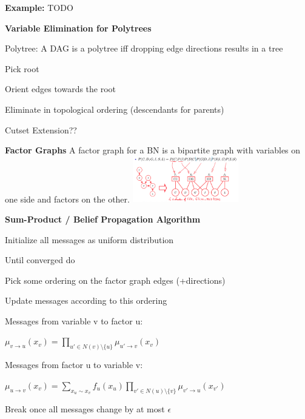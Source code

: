 \documentclass[a4paper, 11pt, landscape]{article}
\begin{document}
\begin{multicols*}{3}
\begin{compactitem}
	\end{compactitem}
	
	\textbf{Example:} TODO
		
	\textbf{Variable Elimination for Polytrees}
	
	Polytree: A DAG is a polytree iff dropping edge directions results in a tree
	\begin{compactitem}
		\item Pick root
		\item Orient edges towards the root
		\item Eliminate in topological ordering (descendants for parents)
	\end{compactitem}

	Cutset Extension??
	
	\textbf{Factor Graphs}
	A factor graph for a BN is a bipartite graph with variables on one side and  factors on the other.
	\includegraphics[height=2cm]{img/pai2.png}
	
	\textbf{Sum-Product / Belief Propagation Algorithm}	
	
	\begin{compactitem}
		\item Initialize all messages as uniform distribution  
		\item Until converged do
		\begin{compactenum}
			\item Pick some ordering on the factor graph edges (+directions)   
			\item Update messages according to this ordering
			
			Messages from variable v to factor u: 
			
			$\mu_{v \rightarrow u}(x_v) = \prod_{u' \in N(v) \setminus \{u\}} \mu_{u' \rightarrow v}(x_{v})$ 
			
			Messages from factor u to variable v:
			
			$\mu_{u \rightarrow v}(x_v) = \sum_{x_u \sim x_v} f_u(x_u) \prod_{v' \in N(u) \setminus \{v\}} \mu_{v' \rightarrow u}(x_{v'})$ 

			\item Break once all messages change by at most $\epsilon$
		\end{compactenum}
	\end{compactitem}


\end{multicols*}
\end{document}
